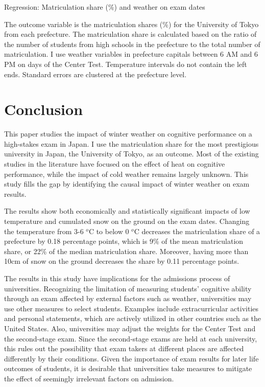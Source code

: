 \documentclass[12pt,letterpaper]{article}
\begin{document}
\begin{table}[H]
  \center
  \caption{Regression: Matriculation share (\%) and weather on exam dates}
  \footnotesize
  
  \label{tab:main_reg}
  \small
  \begin{tablenotes}
    \item
      The outcome variable is the matriculation shares (\%) for the University of Tokyo from each prefecture.
      The matriculation share is calculated based on the ratio of the number of students from high schools in the prefecture to the total number of matriculation.
      I use weather variables in prefecture capitals between 6 AM and 6 PM on days of the Center Test.
      Temperature intervals do not contain the left ends.
      Standard errors are clustered at the prefecture level.
  \end{tablenotes}
\end{table}

\section{Conclusion}\label{sec:conclusion}

This paper studies the impact of winter weather on cognitive performance on a high-stakes exam in Japan.
I use the matriculation share for the most prestigious university in Japan, the University of Tokyo, as an outcome.
Most of the existing studies in the literature have focused on the effect of heat on cognitive performance, while the impact of cold weather remains largely unknown.
This study fills the gap by identifying the causal impact of winter weather on exam results.

The results show both economically and statistically significant impacts of low temperature and cumulated snow on the ground on the exam dates.
Changing the temperature from 3-6 $^o$C to below 0 $^o$C decreases the matriculation share of a prefecture by 0.18 percentage points, which is 9\% of the mean matriculation share, or 22\% of the median matriculation share.
Moreover, having more than 10cm of snow on the ground decreases the share by 0.11 percentage points.

The results in this study have implications for the admissions process of universities.
Recognizing the limitation of measuring students' cognitive ability through an exam affected by external factors such as weather, universities may use other measures to select students.
Examples include extracurricular activities and personal statements, which are actively utilized in other countries such as the United States.
Also, universities may adjust the weights for the Center Test and the second-stage exam.
Since the second-stage exams are held at each university, this rules out the possibility that exam takers at different places are affected differently by their conditions.
Given the importance of exam results for later life outcomes of students, it is desirable that universities take measures to mitigate the effect of seemingly irrelevant factors on admission.
\end{document}
